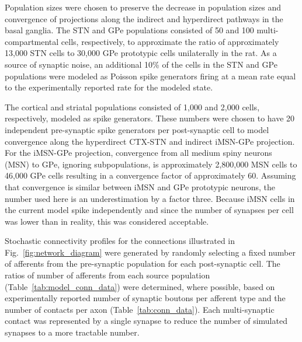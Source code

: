 Population sizes were chosen to preserve the decrease in population sizes and convergence of projections along the indirect and hyperdirect pathways in the basal ganglia. The STN and GPe populations consisted of 50 and 100 multi-compartmental cells, respectively, to approximate the ratio of approximately 13,000 STN cells to 30,000 GPe prototypic cells \cite{abdi_prototypic_2015,oorschot_absolute_1999} unilaterally in the rat.
%
As a source of synaptic noise, an additional 10\% of the cells in the STN and GPe populations were modeled as Poisson spike generators firing at a mean rate equal to the experimentally reported rate for the modeled state.

The cortical and striatal populations consisted of 1,000 and 2,000 cells, respectively, modeled as spike generators. These numbers were chosen to have 20 independent pre-synaptic spike generators per post-synaptic cell to model convergence along the hyperdirect CTX-STN and indirect iMSN-GPe projection. For the iMSN-GPe projection, convergence from all medium spiny neurons (MSN) to GPe, ignoring subpopulations, is approximately 2,800,000 MSN cells to 46,000 GPe cells \cite{oorschot_total_1996} resulting in a convergence factor of approximately 60. Assuming that convergence is similar between iMSN and GPe prototypic neurons, the number used here is an underestimation by a factor three. Because iMSN cells in the current model spike independently and since the number of synapses per cell was lower than in reality, this was considered acceptable.

%
%
%
%
%

Stochastic connectivity profiles for the connections illustrated in Fig.~\ref{fig:network_diagram} were generated by randomly selecting a fixed number of afferents from the pre-synaptic population for each post-synaptic cell. The ratios of number of afferents from each source population (Table~\ref{tab:model_conn_data}) were determined, where possible, based on experimentally reported number of synaptic boutons per afferent type and the number of contacts per axon (Table~\ref{tab:conn_data}). Each multi-synaptic contact was represented by a single synapse to reduce the number of simulated synapses to a more tractable number.

%
%
%

